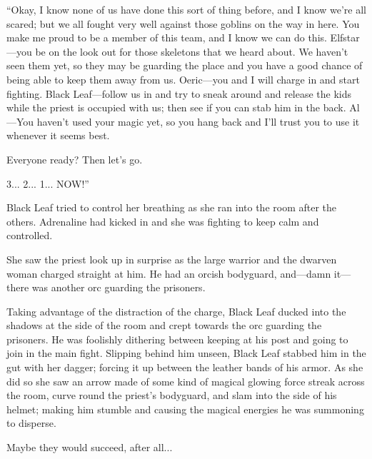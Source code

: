 {“Okay, I know none of us have done this sort of thing before, and I know we’re all scared; but we all fought very well against those goblins on the way in here. You make me proud to be a member of this team, and I know we can do this. Elfstar—you be on the look out for those skeletons that we heard about. We haven’t seen them yet, so they may be guarding the place and you have a good chance of being able to keep them away from us. Oeric—you and I will charge in and start fighting. Black Leaf—follow us in and try to sneak around and release the kids while the priest is occupied with us; then see if you can stab him in the back. Al—You haven’t used your magic yet, so you hang back and I’ll trust you to use it whenever it seems best.

Everyone ready? Then let’s go.

3... 2... 1... NOW!”

Black Leaf tried to control her breathing as she ran into the room after the others. Adrenaline had kicked in and she was fighting to keep calm and controlled.

She saw the priest look up in surprise as the large warrior and the dwarven woman charged straight at him. He had an orcish bodyguard, and—damn it—there was another orc guarding the prisoners.

Taking advantage of the distraction of the charge, Black Leaf ducked into the shadows at the side of the room and crept towards the orc guarding the prisoners. He was foolishly dithering between keeping at his post and going to join in the main fight. Slipping behind him unseen, Black Leaf stabbed him in the gut with her dagger; forcing it up between the leather bands of his armor. As she did so she saw an arrow made of some kind of magical glowing force streak across the room, curve round the priest’s bodyguard, and slam into the side of his helmet; making him stumble and causing the magical energies he was summoning to disperse.

Maybe they would succeed, after all...
\normalfont}

